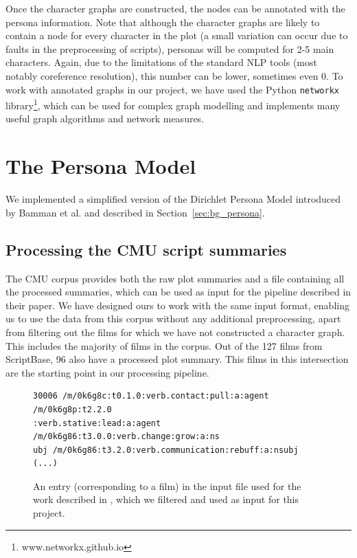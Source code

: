 \documentclass[bsc,frontabs,singlespacing,parskip, twoside]{infthesis}
\begin{document}
Once the character graphs are constructed, the nodes can be annotated with the persona information. Note that although the character graphs are likely to contain a node for every character in the plot (a small variation can occur due to faults in the preprocessing of scripts), personas will be computed for 2-5 main characters. Again, due to the limitations of the standard NLP tools (most notably coreference resolution), this number can be lower, sometimes even 0. To work with annotated graphs in our project, we have used the Python \texttt{networkx} library\footnote{www.networkx.github.io}, which can be used for complex graph modelling and implements many useful graph algorithms and network measures.


\section{The Persona Model}
\label{sec:persona_impl}
We implemented a simplified version of the Dirichlet Persona Model introduced by Bamman et al. \cite{Bamman2013} and described in Section~\ref{sec:bg_persona}. 

\subsection{Processing the CMU script summaries}
\label{sec:processing_cmu}
The CMU corpus provides both the raw plot summaries and a file containing all the processed summaries, which can be used as input for the pipeline described in their paper. We have designed ours to work with the same input format, enabling us to use the data from this corpus without any additional preprocessing, apart from filtering out the films for which we have not constructed a character graph. This includes the majority of films in the corpus. Out of the 127 films from ScriptBase, 96 also have a processed plot summary. This films in this intersection are the starting point in our processing pipeline.

\begin{figure}[h]
\centering
\begin{minipage}{14.5cm}
\begin{Verbatim}[frame=single]
30006 /m/0k6g8c:t0.1.0:verb.contact:pull:a:agent /m/0k6g8p:t2.2.0
:verb.stative:lead:a:agent /m/0k6g86:t3.0.0:verb.change:grow:a:ns
ubj /m/0k6g86:t3.2.0:verb.communication:rebuff:a:nsubj (...)
\end{Verbatim}
\end{minipage}
\caption{An entry (corresponding to a film) in the input file used for the work described in \cite{Bamman2013}, which we filtered and used as input for this project.}
\label{fig:bamman_input}
\end{figure}
\end{document}
